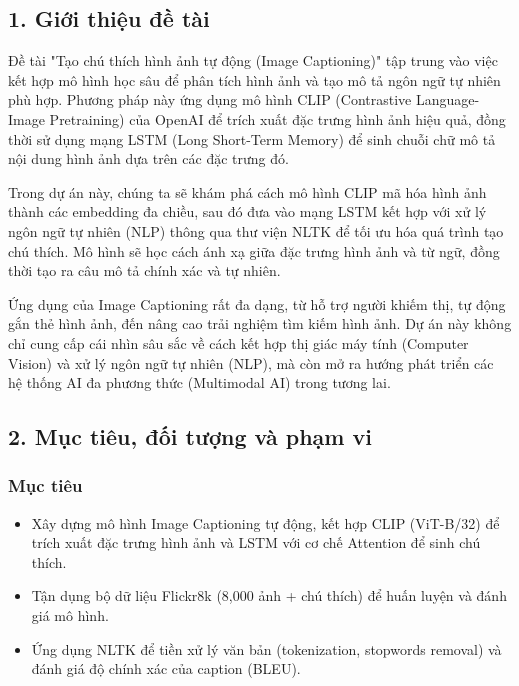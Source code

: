 \documentclass[../main.tex]{subfiles}
\begin{document}
\subsection*{1. Giới thiệu đề tài}

Đề tài "Tạo chú thích hình ảnh tự động (Image Captioning)" tập trung vào việc kết hợp mô hình học sâu để phân tích hình ảnh và tạo mô tả ngôn ngữ tự nhiên phù hợp. Phương pháp này ứng dụng mô hình CLIP (Contrastive Language-Image Pretraining) của OpenAI để trích xuất đặc trưng hình ảnh hiệu quả, đồng thời sử dụng mạng LSTM (Long Short-Term Memory) để sinh chuỗi chữ mô tả nội dung hình ảnh dựa trên các đặc trưng đó.

Trong dự án này, chúng ta sẽ khám phá cách mô hình CLIP mã hóa hình ảnh thành các embedding đa chiều, sau đó đưa vào mạng LSTM kết hợp với xử lý ngôn ngữ tự nhiên (NLP) thông qua thư viện NLTK để tối ưu hóa quá trình tạo chú thích. Mô hình sẽ học cách ánh xạ giữa đặc trưng hình ảnh và từ ngữ, đồng thời tạo ra câu mô tả chính xác và tự nhiên.

Ứng dụng của Image Captioning rất đa dạng, từ hỗ trợ người khiếm thị, tự động gắn thẻ hình ảnh, đến nâng cao trải nghiệm tìm kiếm hình ảnh. Dự án này không chỉ cung cấp cái nhìn sâu sắc về cách kết hợp thị giác máy tính (Computer Vision) và xử lý ngôn ngữ tự nhiên (NLP), mà còn mở ra hướng phát triển các hệ thống AI đa phương thức (Multimodal AI) trong tương lai.

\subsection*{2. Mục tiêu, đối tượng và phạm vi}

\subsubsection*{Mục tiêu}
\begin{itemize}
    \item Xây dựng mô hình Image Captioning tự động, kết hợp CLIP (ViT-B/32) để trích xuất đặc trưng hình ảnh và LSTM với cơ chế Attention để sinh chú thích.
    \item Tận dụng bộ dữ liệu Flickr8k (8,000 ảnh + chú thích) để huấn luyện và đánh giá mô hình.
    \item Ứng dụng NLTK để tiền xử lý văn bản (tokenization, stopwords removal) và đánh giá độ chính xác của caption (BLEU).
\end{itemize}
\end{document}
